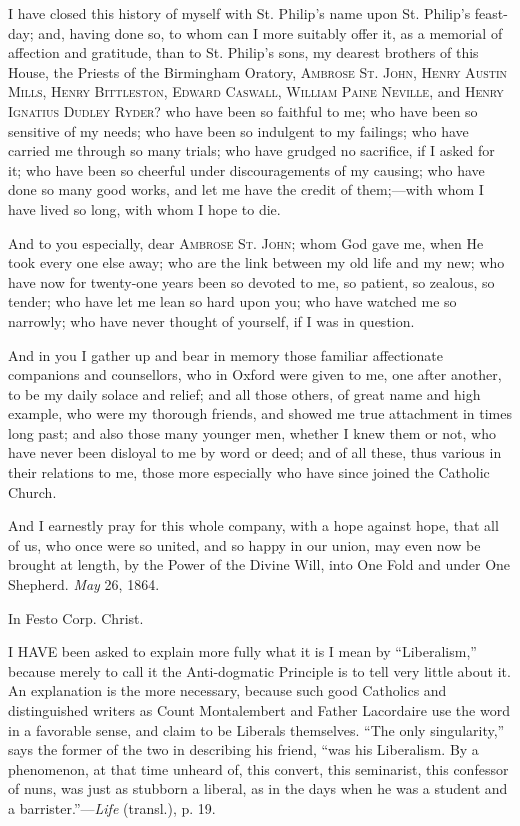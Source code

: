 I have closed this history of myself with St. Philip's name upon St.
Philip's feast-day; and, having done so, to whom can I more suitably
offer it, as a memorial of affection and gratitude, than to St.
Philip's sons, my dearest brothers of this House, the Priests of the
Birmingham Oratory, A\textsc{mbrose} S\textsc{t}.
J\textsc{ohn}, H\textsc{enry} A\textsc{ustin}
M\textsc{ills}, H\textsc{enry} B\textsc{ittleston},
E\textsc{dward} C\textsc{aswall}, W\textsc{illiam}
P\textsc{aine} N\textsc{eville}, and H\textsc{enry}
I\textsc{gnatius} D\textsc{udley} R\textsc{yder}? who have been so faithful to me; who have been so
sensitive of my needs; who have been so indulgent to my failings; who
have carried me through so many trials; who have grudged no sacrifice,
if I asked for it; who have been so cheerful under discouragements of my
causing; who have done so many good works, and let me have the credit of
them;—with whom I have lived so long, with whom I hope to die.

And to you especially, dear A\textsc{mbrose} S\textsc{t}.
J\textsc{ohn}; whom God gave me, when
He took every one else away; who are the link between my old life and my
new; who have now for twenty-one years been so devoted to me, so
patient, so zealous, so tender; who have let me lean so hard upon you;
who have watched me so narrowly; who have never thought of yourself, if
I was in question.

And in you I gather up and bear in memory those familiar affectionate
companions and counsellors, who in Oxford were given to me, one after
another, to be my daily solace and relief; and all those others, of
great name and high example, who were my thorough friends, and showed me
true attachment in times long past; and also those many younger men, whether I knew them or not, who have never been disloyal to me
by word or deed; and of all these, thus various in their relations
to me, those more especially who have since joined the Catholic Church.

And I earnestly pray for this whole company, with a hope against
hope, that all of us, who once were so united, and so happy in our
union, may even now be brought at length, by the Power of the Divine
Will, into One Fold and under One Shepherd.
\emph{May} 26, 1864.

In Festo Corp. Christ.



I HAVE been asked to
explain more fully what it is I mean by ``Liberalism,''
because
merely to call it the Anti-dogmatic Principle is to tell very little
about it. An explanation is the more necessary, because such good
Catholics and distinguished writers as Count Montalembert and Father
Lacordaire use the word in a favorable sense, and claim to be Liberals
themselves. ``The only singularity,'' says the former of the two
in describing his friend, ``was his Liberalism. By a phenomenon, at
that time unheard of, this convert, this seminarist, this confessor of
nuns, was just as stubborn a liberal, as in the days when he was a
student and a barrister.''—\emph{Life} (transl.), p. 19.

